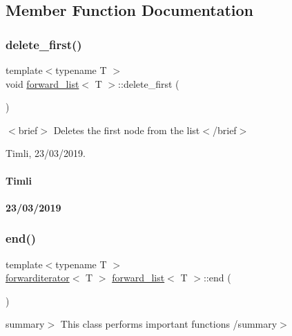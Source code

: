 \subsection{Member Function Documentation}
\mbox{\label{classforward__list_a8280b378273f3146942cabd09ccfe34d}} 
\subsubsection{\texorpdfstring{delete\_first()}{delete\_first()}}
{\footnotesize\ttfamily template$<$typename T $>$ \\
void \mbox{\hyperlink{classforward__list}{forward\+\_\+list}}$<$ T $>$\+::delete\+\_\+first (\begin{DoxyParamCaption}{ }\end{DoxyParamCaption})}

$<$brief$>$ Deletes the first node from the list$<$/brief$>$

Timli, 23/03/2019.

\paragraph*{Timli}

\paragraph*{23/03/2019}\mbox{\label{classforward__list_a716064de94a50a5c3dbedccb351c9d68}} 
\subsubsection{\texorpdfstring{end()}{end()}}
{\footnotesize\ttfamily template$<$typename T $>$ \\
\mbox{\hyperlink{classforwarditerator}{forwarditerator}}$<$ T $>$ \mbox{\hyperlink{classforward__list}{forward\+\_\+list}}$<$ T $>$\+::end (\begin{DoxyParamCaption}{ }\end{DoxyParamCaption})}

summary$>$ This class performs important functions /summary$>$ \mbox{\label{classforward__list_a8d5eb5d0740e94215668417448d5aa05}} 
